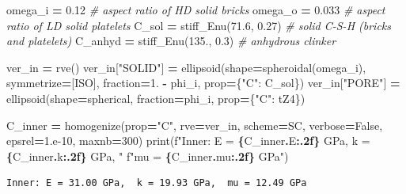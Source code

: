 \documentclass[
  a4paper,
  numbers=noendperiod,
  DIV=12]{scrreprt}
\newenvironment{Shaded}{\begin{snugshade}}{\end{snugshade}}
\newcommand{\BuiltInTok}[1]{#1}
\newcommand{\CommentTok}[1]{\textcolor[rgb]{0.56,0.35,0.01}{\textit{#1}}}
\newcommand{\DecValTok}[1]{\textcolor[rgb]{0.00,0.00,0.81}{#1}}
\newcommand{\FloatTok}[1]{\textcolor[rgb]{0.00,0.00,0.81}{#1}}
\newcommand{\NormalTok}[1]{#1}
\newcommand{\OperatorTok}[1]{\textcolor[rgb]{0.81,0.36,0.00}{\textbf{#1}}}
\newcommand{\SpecialCharTok}[1]{\textcolor[rgb]{0.81,0.36,0.00}{\textbf{#1}}}
\newcommand{\SpecialStringTok}[1]{\textcolor[rgb]{0.31,0.60,0.02}{#1}}
\newcommand{\StringTok}[1]{\textcolor[rgb]{0.31,0.60,0.02}{#1}}
\newcommand{\VariableTok}[1]{\textcolor[rgb]{0.00,0.00,0.00}{#1}}
\begin{document}
\begin{Shaded}
\begin{Highlighting}[]
\NormalTok{omega\_i }\OperatorTok{=} \FloatTok{0.12}    \CommentTok{\# aspect ratio of HD solid bricks}
\NormalTok{omega\_o }\OperatorTok{=} \FloatTok{0.033}   \CommentTok{\# aspect ratio of LD solid platelets}
\NormalTok{C\_sol   }\OperatorTok{=}\NormalTok{ stiff\_Enu(}\FloatTok{71.6}\NormalTok{, }\FloatTok{0.27}\NormalTok{)   }\CommentTok{\# solid C{-}S{-}H (bricks and platelets)}
\NormalTok{C\_anhyd }\OperatorTok{=}\NormalTok{ stiff\_Enu(}\FloatTok{135.}\NormalTok{,  }\FloatTok{0.3}\NormalTok{)   }\CommentTok{\# anhydrous clinker}

\NormalTok{ver\_in }\OperatorTok{=}\NormalTok{ rve()}
\NormalTok{ver\_in[}\StringTok{"SOLID"}\NormalTok{] }\OperatorTok{=}\NormalTok{ ellipsoid(shape}\OperatorTok{=}\NormalTok{spheroidal(omega\_i), symmetrize}\OperatorTok{=}\NormalTok{[ISO],}
\NormalTok{                             fraction}\OperatorTok{=}\FloatTok{1.} \OperatorTok{{-}}\NormalTok{ phi\_i, prop}\OperatorTok{=}\NormalTok{\{}\StringTok{"C"}\NormalTok{: C\_sol\})}
\NormalTok{ver\_in[}\StringTok{"PORE"}\NormalTok{]  }\OperatorTok{=}\NormalTok{ ellipsoid(shape}\OperatorTok{=}\NormalTok{spherical, fraction}\OperatorTok{=}\NormalTok{phi\_i, prop}\OperatorTok{=}\NormalTok{\{}\StringTok{"C"}\NormalTok{: tZ4\})}

\NormalTok{C\_inner }\OperatorTok{=}\NormalTok{ homogenize(prop}\OperatorTok{=}\StringTok{"C"}\NormalTok{, rve}\OperatorTok{=}\NormalTok{ver\_in, scheme}\OperatorTok{=}\NormalTok{SC,}
\NormalTok{                     verbose}\OperatorTok{=}\VariableTok{False}\NormalTok{, epsrel}\OperatorTok{=}\FloatTok{1.e{-}10}\NormalTok{, maxnb}\OperatorTok{=}\DecValTok{300}\NormalTok{)}
\BuiltInTok{print}\NormalTok{(}\SpecialStringTok{f"Inner: E = }\SpecialCharTok{\{}\NormalTok{C\_inner}\SpecialCharTok{.}\NormalTok{E}\SpecialCharTok{:.2f\}}\SpecialStringTok{ GPa,  k = }\SpecialCharTok{\{}\NormalTok{C\_inner}\SpecialCharTok{.}\NormalTok{k}\SpecialCharTok{:.2f\}}\SpecialStringTok{ GPa,  "}
      \SpecialStringTok{f"mu = }\SpecialCharTok{\{}\NormalTok{C\_inner}\SpecialCharTok{.}\NormalTok{mu}\SpecialCharTok{:.2f\}}\SpecialStringTok{ GPa"}\NormalTok{)}
\end{Highlighting}
\end{Shaded}

\begin{verbatim}
Inner: E = 31.00 GPa,  k = 19.93 GPa,  mu = 12.49 GPa
\end{verbatim}
\end{document}
